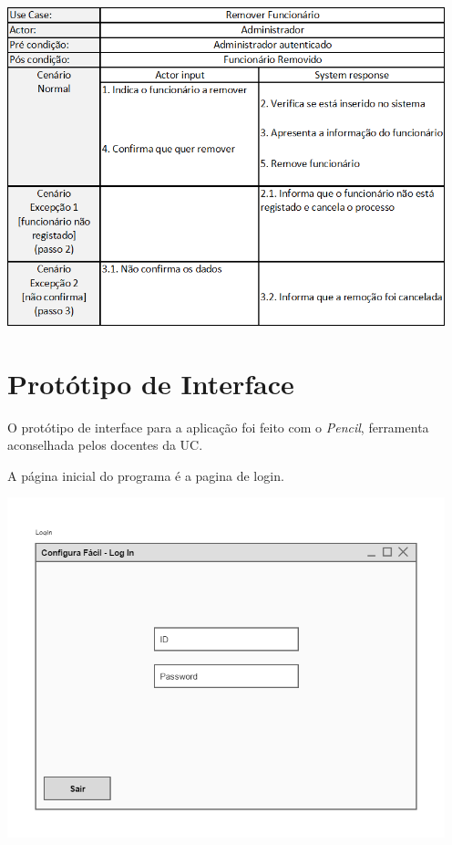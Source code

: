 \documentclass[11pt]{article} %
\begin{document}
\begin{enumerate}
\begin{center}
	\end{center}
	\begin{center}
		\includegraphics[width = 5in]{gfunc_remover.png}
	\end{center}
\end{enumerate}

\section{Protótipo de Interface}
O protótipo de interface para a aplicação foi feito com o \textit{Pencil}, ferramenta aconselhada pelos docentes da UC.

A página inicial do programa é a pagina de login.
\begin{center}
 	\includegraphics[width = 5in]{configura_fcil_root.png}
\end{center}
\end{document}
